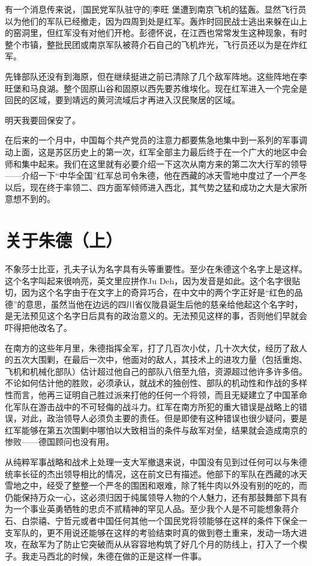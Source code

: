 \documentclass[10pt]{book}
\begin{document}
有一个消息传来说，[国民党军队驻守的]李旺 堡遭到南京飞机的猛轰。显然飞行员以为他们的军队已经撤走，因为四周到处是红军。轰炸时回民战士逃出来躲在山上的窑洞里，但红军没有对他们开枪。彭德怀说，在江西也常常发生这种现象，有时整个市镇，整批民团或南京军队被蒋介石自己的飞机炸光，飞行员还以为是在炸红军。

先锋部队还没有到海原，但在继续挺进之前已清除了几个敌军阵地。这些阵地在李旺堡和马良湖。整个固原山谷和固原以西先要苏维埃化。现在红军进入一个完全是回民的区域，要到靖远的黄河流域后才再进入汉民聚居的区域。

明天我要回保安了。

在后来的一个月中，中国每个共产党员的注意力都要焦急地集中到一系列的军事调动上面，这是苏区历史上的第一次，红军全部主力最后终于在一个广大的地区中会师和集中起来。我们在这里就有必要介绍一下这次从南方来的第二次大行军的领导——介绍一下“中华全国”红军总司令朱德，他在西藏的冰天雪地中度过了一个严冬以后，现在终于率领二、四方面军倾师进入西北，其气势之猛和成功之大是大家所意想不到的。

\section{关于朱德（上）}

不象莎士比亚，孔夫子认为名字具有头等重要性。至少在朱德这个名字上是这样。这个名字叫起来很响亮，英文里应拼作Ju Deh，因为发音是如此。这个名字很贴切，因为这个名字由于在文字上的奇异巧合，在中文中的两个字正好是“红色的品德”的意思，虽然当他在边远的四川省仪陇县诞生后他的慈亲给他起这个名字时，是无法预见这个名字日后具有的政治意义的。无法预见这样的事，否则他们早就会吓得把他改名了。

在南方的这些年月里，朱德指挥全军，打了几百次小仗，几十次大仗，经历了敌人的五次大围剿，在最后一次中，他面对的敌人，其技术上的进攻力量（包括重炮、飞机和机械化部队）估计超过他自己的部队八倍至九倍，资源超过他许多许多倍。不论如何估计他的胜败，必须承认，就战术的独创性、部队的机动性和作战的多样性而言，他再三证明自己胜过派来打他的任何一个将领，而且无疑建立了中国革命化军队在游击战中的不可轻侮的战斗力。红军在南方所犯的重大错误是战略上的错误，对此，政治领导人必须负主要的责任。但是即使有这种错误也很少疑问，要是红军能够在第五次围剿中哪怕以大致相当的条件与敌军对垒，结果就会造成南京的惨败——德国顾问也没有用。

从纯粹军事战略和战术上处理一支大军撤退来说，中国没有见到过任何可以与朱德统率长征的杰出领导相比的情况，这在前文已有描述。他部下的军队在西藏的冰天雪地之中，经受了整整一个严冬的围困和艰难，除了牦牛肉以外没有别的吃的，而仍能保持万众一心，这必须归因于纯属领导人物的个人魅力，还有那鼓舞部下具有为一个事业英勇牺牲的忠贞不贰精神的罕见人品。至少我个人是不可能想象蒋介石、白崇禧、宁哲元或者中国任何其他一个国民党将领能够在这样的条件下保全一支军队的，更不用说还能够在这样的考验结束时真的做到卷土重来，发动一场大进攻，在敌军为了防止它突破而从从容容地构筑了好几个月的防线上，打入了一个楔子。我走马西北的时候，朱德在做的正是这样一件事。
\end{document}
